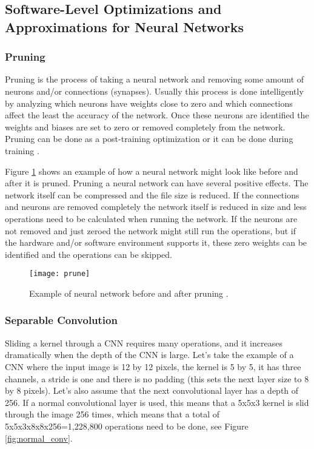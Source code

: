 \subsection{Software-Level Optimizations and Approximations for Neural Networks}

\subsubsection{Pruning}

Pruning is the process of taking a neural network and removing some amount of neurons and/or connections (synapses). Usually this process is done intelligently by analyzing which neurons have weights close to zero and which connections affect the least the accuracy of the network. Once these neurons are identified the weights and biases are set to zero or removed completely from the network. Pruning can be done as a post-training optimization or it can be done during training \cite{prune1}.

Figure \ref{fig:prune} shows an example of how a neural network might look like before and after it is pruned. Pruning a neural network can have several positive effects. The network itself can be compressed and the file size is reduced. If the connections and neurons are removed completely the network itself is reduced in size and less operations need to be calculated when running the network. If the neurons are not removed and just zeroed the network might still run the operations, but if the hardware and/or software environment supports it, these zero weights can be identified and the operations can be skipped.

\begin{figure}[thbp]
	\centering
	\texttt{[image: prune]}
	\caption[Example of neural network before and after pruning.]{Example of neural network before and after pruning \cite{Han2015}.}
	\label{fig:prune}
\end{figure}

\subsubsection{Separable Convolution}

Sliding a kernel through a CNN requires many operations, and it increases dramatically when the depth of the CNN is large. Let's take the example of a CNN where the input image is 12 by 12 pixels, the kernel is 5 by 5, it has three channels, a stride is one and there is no padding (this sets the next layer size to 8 by 8 pixels). Let's also assume that the next convolutional layer has a depth of 256. If a normal convolutional layer is used, this means that a 5x5x3 kernel is slid through the image 256 times, which means that a total of 5x5x3x8x8x256=1,228,800 operations need to be done, see Figure \ref{fig:normal_conv}.

